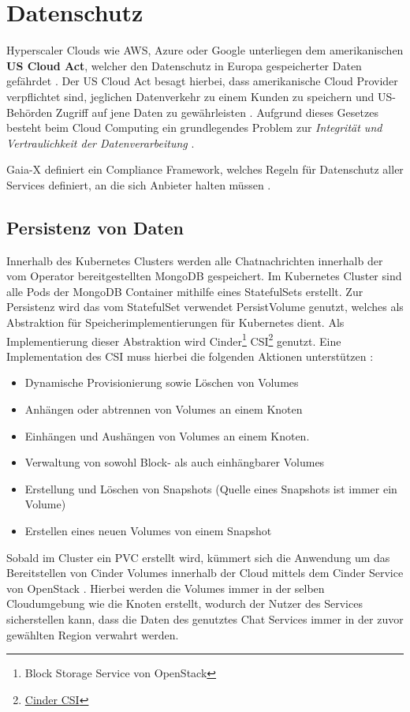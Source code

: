 \section{Datenschutz}
\label{sec:slas:datenschutz}
Hyperscaler Clouds wie \ac{AWS}, Azure oder Google unterliegen dem amerikanischen \textbf{US Cloud Act}, welcher
den Datenschutz in Europa gespeicherter Daten gefährdet \cite{Kagermann2021}. Der US Cloud Act besagt hierbei,
dass amerikanische Cloud Provider verpflichtet sind, jeglichen Datenverkehr zu einem Kunden zu speichern und 
US-Behörden Zugriff auf jene Daten zu gewährleisten \cite{CloudAct2018}.
Aufgrund dieses Gesetzes besteht beim Cloud Computing ein grundlegendes Problem 
zur \emph{Integrität und Vertraulichkeit der Datenverarbeitung} \cite{Weichert2010}.

Gaia-X definiert ein Compliance Framework, welches Regeln für Datenschutz aller Services definiert, an die sich
Anbieter halten müssen \cite{}. 


\subsection{Persistenz von Daten}
\label{subsec:datenschutz:persistenz}
Innerhalb des Kubernetes Clusters werden alle Chatnachrichten innerhalb der vom Operator bereitgestellten
MongoDB gespeichert. Im Kubernetes Cluster sind alle Pods der MongoDB Container mithilfe eines StatefulSets 
erstellt. Zur Persistenz wird das vom StatefulSet verwendet PersistVolume genutzt,
welches als Abstraktion für Speicherimplementierungen für Kubernetes dient.
Als Implementierung dieser Abstraktion wird 
Cinder\footnote{Block Storage Service von OpenStack} CSI\footnote{\href{https://github.com/kubernetes/cloud-provider-openstack/tree/master/pkg/csi/cinder}{Cinder CSI}} genutzt. 
Eine Implementation des \ac{CSI} muss hierbei die folgenden Aktionen unterstützen \cite{container-storage-interface_2021}:
\begin{itemize}
  \item Dynamische Provisionierung sowie Löschen von Volumes
  \item Anhängen oder abtrennen von Volumes an einem Knoten
  \item Einhängen und Aushängen von Volumes an einem Knoten.
  \item Verwaltung von sowohl Block- als auch einhängbarer Volumes
  \item Erstellung und Löschen von Snapshots (Quelle eines Snapshots ist immer ein Volume)
  \item Erstellen eines neuen Volumes von einem Snapshot
\end{itemize}

Sobald im Cluster ein \ac{PVC} erstellt wird, kümmert sich die Anwendung um das Bereitstellen von 
Cinder Volumes innerhalb der Cloud mittels dem Cinder Service von OpenStack \cite{cinderCSI}.
Hierbei werden die Volumes immer in der selben Cloudumgebung wie die Knoten erstellt, wodurch der 
Nutzer des Services sicherstellen kann, dass die Daten des genutztes Chat Services immer in der zuvor 
gewählten Region verwahrt werden.